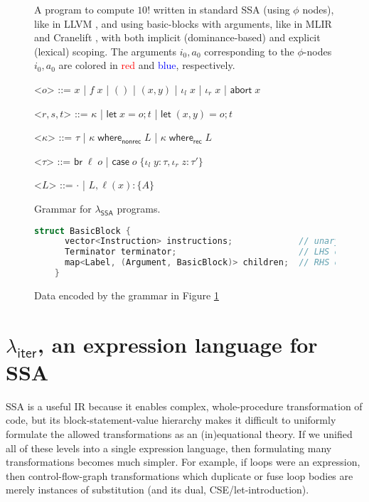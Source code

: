 \documentclass[acmsmall,screen,review]{acmart}
\newcommand{\ms}[1]{\ensuremath{\mathsf{#1}}}
\newcommand{\lto}{:}
\newcommand{\linl}[1]{\iota_l\;{#1}}
\newcommand{\linr}[1]{\iota_r\;{#1}}
\newcommand{\labort}[1]{\ms{abort}\;{#1}}
\newcommand{\letstmt}[3]{\ensuremath{\ms{let}\;#1 = #2; #3}}
\newcommand{\brb}[2]{\ms{br}\;#1\;#2}
\newcommand{\casestmt}[5]{\ms{case}\;#1\;\{\linl{#2} \lto #3, \linr{#4} \lto #5\}}
\newcommand{\awhere}[2]{#1\;\ms{where}_{\ms{nonrec}}\;#2}
\newcommand{\cwhere}[2]{#1\;\ms{where}_{\ms{rec}}\;#2}
\newcommand{\wbranch}[3]{#1(#2) \lto \{#3\}}
\newcommand{\subiterexp}{\texorpdfstring{\(\lambda_{\ms{iter}}\)}{lambda-iter}}
\newcommand{\isotopessa}{\(\lambda_{\ms{SSA}}\)}
\begin{document}
\begin{figure}
  \caption{%
    A program to compute $10!$ written in standard SSA (using $\phi$ nodes), like in LLVM
    \cite{llvm}, and using basic-blocks with arguments, like in MLIR \cite{mlir} and Cranelift
    \cite{cranelift}, with both implicit (dominance-based) and explicit (lexical) scoping. The
    arguments $i_0, a_0$ corresponding to the $\phi$-nodes $i_0, a_0$ are colored in
    \textcolor{red}{red} and \textcolor{blue}{blue}, respectively.%
  }
  \Description{}
\end{figure}

\begin{figure}
  \begin{grammar}
    <\(o\)> ::= \(x\)
      \;|\; \(f\;x\)
      \;|\; \(()\)
      \;|\; \((x, y)\)
      \;|\;  \(\linl{x}\)
      \;|\; \(\linr{x}\)
      \;|\; \(\labort{x}\)

    <\(r, s, t\)> ::= \(\kappa\)
      \;|\; \(\letstmt{x}{o}{t}\)
      \;|\; \(\letstmt{(x, y)}{o}{t}\)

    <\(\kappa\)> ::= \(\tau\) \;|\; \(\awhere{\kappa}{L}\) \;|\; \(\cwhere{\kappa}{L}\)

    <\(\tau\)> ::= \(\brb{\ell}{o}\)
      \;|\; \(\casestmt{o}{y}{\tau}{z}{\tau'}\)

    <\(L\)> ::= \(\cdot\) \;|\; \(L, \wbranch{\ell}{x}{A}\)
  \end{grammar}
  \caption{Grammar for \isotopessa{} programs.}
  \Description{}
  \label{fig:ssa-syntax}
\end{figure}

\begin{figure}
  \begin{lstlisting}[language=C++]
    struct BasicBlock {
      vector<Instruction> instructions;             // unary/binary let-bindings
      Terminator terminator;                        // LHS of where-block
      map<Label, (Argument, BasicBlock)> children;  // RHS of where-block
    }
  \end{lstlisting}
  \caption{Data encoded by the grammar in Figure \ref{fig:ssa-syntax}}
  \Description{}
  \label{fig:ssa-data}
\end{figure}

\section{\subiterexp{}, an expression language for SSA }

SSA is a useful IR because it enables complex, whole-procedure transformation of code, but
its block-statement-value hierarchy makes it difficult to uniformly formulate the allowed
transformations as an (in)equational
theory. If we unified all of these levels into a single
expression language, then formulating many transformations becomes much simpler. For example, if
loops were an expression, then control-flow-graph transformations which duplicate or fuse loop
bodies are merely instances of substitution (and its dual, CSE/let-introduction). 
\end{document}
